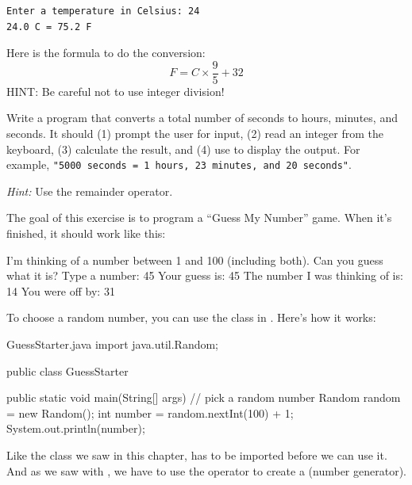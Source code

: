 {{\begin{exercise}
\begin{verbatim}
Enter a temperature in Celsius: 24
24.0 C = 75.2 F
\end{verbatim}

Here is the formula to do the conversion:
%
\[ F = C \times \frac{9}{5} + 32 \]
%
HINT: Be careful not to use integer division!

\end{exercise}


\begin{exercise}  %

Write a program that converts a total number of seconds to hours, minutes, and seconds.
It should (1) prompt the user for input, (2) read an integer from the keyboard, (3) calculate the result, and (4) use  to display the output.
For example, {\tt "5000 seconds = 1 hours, 23 minutes, and 20 seconds"}.

{\it Hint:} Use the remainder operator.

\end{exercise}


\begin{exercise}  %
\label{guess}

The goal of this exercise is to program a ``Guess My Number'' game.
When it's finished, it should work like this:

\begin{stdout}
I'm thinking of a number between 1 and 100
(including both). Can you guess what it is?
Type a number: 45
Your guess is: 45
The number I was thinking of is: 14
You were off by: 31
\end{stdout}

To choose a random number, you can use the  class in .
Here's how it works:


\begin{trinket}{GuessStarter.java}
import java.util.Random;

public class GuessStarter {

    public static void main(String[] args) {
        // pick a random number
        Random random = new Random();
        int number = random.nextInt(100) + 1;
        System.out.println(number);
    }
}
\end{trinket}


Like the  class we saw in this chapter,  has to be imported before we can use it.
And as we saw with , we have to use the  operator to create a  (number generator).


\end{exercise}}}
